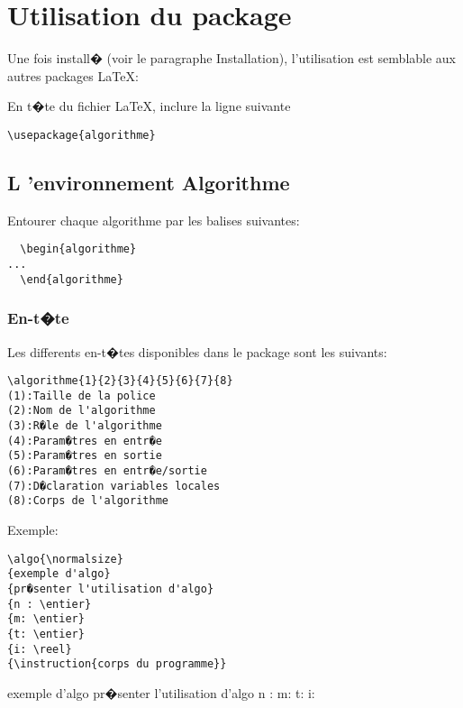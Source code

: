 \documentclass[a4paper,12pt]{report}
\begin{document}
\chapter{Utilisation du package}
Une fois install� (voir le paragraphe Installation), l'utilisation est semblable aux autres packages \LaTeX :


En t�te du fichier \LaTeX, inclure la ligne suivante
\begin{lstlisting}
\usepackage{algorithme}
\end{lstlisting}

\section{L 'environnement Algorithme}

Entourer chaque algorithme par les balises suivantes:
\begin{lstlisting}
  \begin{algorithme}
...
  \end{algorithme}
\end{lstlisting}


\subsection{En-t�te}

Les differents en-t�tes disponibles dans le package sont les suivants:


\begin{lstlisting}
\algorithme{1}{2}{3}{4}{5}{6}{7}{8}
(1):Taille de la police
(2):Nom de l'algorithme
(3):R�le de l'algorithme 
(4):Param�tres en entr�e
(5):Param�tres en sortie
(6):Param�tres en entr�e/sortie
(7):D�claration variables locales
(8):Corps de l'algorithme
\end{lstlisting}

Exemple:

\begin{lstlisting}
\algo{\normalsize}
{exemple d'algo}
{pr�senter l'utilisation d'algo}
{n : \entier}
{m: \entier}
{t: \entier}
{i: \reel}
{\instruction{corps du programme}}
\end{lstlisting}

\begin{algorithme}
  \algo{\normalsize}
  {exemple d'algo}
  {pr�senter l'utilisation d'algo}
  {n : \entier}
  {m: \entier}
  {t: \entier}
  {i: \reel}
  {}

\end{algorithme}
\end{document}
